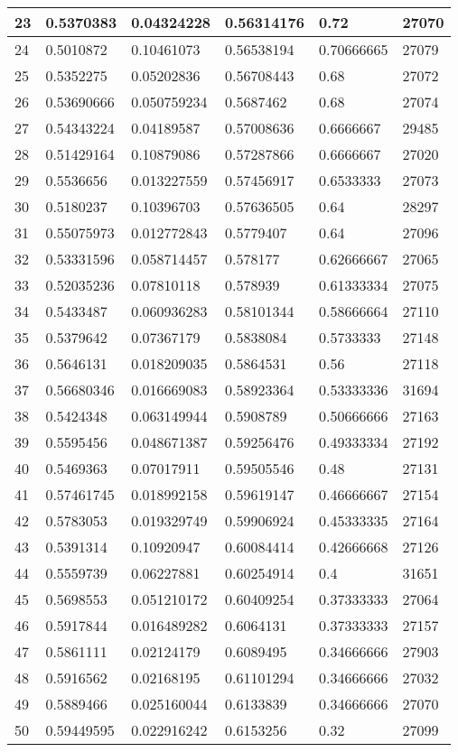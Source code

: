 \begin{longtable}{|l|l|l|l|l|l|}
23 & 0.5370383 & 0.04324228 & 0.56314176 & 0.72 & 27070 \\ \hline 
24 & 0.5010872 & 0.10461073 & 0.56538194 & 0.70666665 & 27079 \\ \hline 
25 & 0.5352275 & 0.05202836 & 0.56708443 & 0.68 & 27072 \\ \hline 
26 & 0.53690666 & 0.050759234 & 0.5687462 & 0.68 & 27074 \\ \hline 
27 & 0.54343224 & 0.04189587 & 0.57008636 & 0.6666667 & 29485 \\ \hline 
28 & 0.51429164 & 0.10879086 & 0.57287866 & 0.6666667 & 27020 \\ \hline 
29 & 0.5536656 & 0.013227559 & 0.57456917 & 0.6533333 & 27073 \\ \hline 
30 & 0.5180237 & 0.10396703 & 0.57636505 & 0.64 & 28297 \\ \hline 
31 & 0.55075973 & 0.012772843 & 0.5779407 & 0.64 & 27096 \\ \hline 
32 & 0.53331596 & 0.058714457 & 0.578177 & 0.62666667 & 27065 \\ \hline 
33 & 0.52035236 & 0.07810118 & 0.578939 & 0.61333334 & 27075 \\ \hline 
34 & 0.5433487 & 0.060936283 & 0.58101344 & 0.58666664 & 27110 \\ \hline 
35 & 0.5379642 & 0.07367179 & 0.5838084 & 0.5733333 & 27148 \\ \hline 
36 & 0.5646131 & 0.018209035 & 0.5864531 & 0.56 & 27118 \\ \hline 
37 & 0.56680346 & 0.016669083 & 0.58923364 & 0.53333336 & 31694 \\ \hline 
38 & 0.5424348 & 0.063149944 & 0.5908789 & 0.50666666 & 27163 \\ \hline 
39 & 0.5595456 & 0.048671387 & 0.59256476 & 0.49333334 & 27192 \\ \hline 
40 & 0.5469363 & 0.07017911 & 0.59505546 & 0.48 & 27131 \\ \hline 
41 & 0.57461745 & 0.018992158 & 0.59619147 & 0.46666667 & 27154 \\ \hline 
42 & 0.5783053 & 0.019329749 & 0.59906924 & 0.45333335 & 27164 \\ \hline 
43 & 0.5391314 & 0.10920947 & 0.60084414 & 0.42666668 & 27126 \\ \hline 
44 & 0.5559739 & 0.06227881 & 0.60254914 & 0.4 & 31651 \\ \hline 
45 & 0.5698553 & 0.051210172 & 0.60409254 & 0.37333333 & 27064 \\ \hline 
46 & 0.5917844 & 0.016489282 & 0.6064131 & 0.37333333 & 27157 \\ \hline 
47 & 0.5861111 & 0.02124179 & 0.6089495 & 0.34666666 & 27903 \\ \hline 
48 & 0.5916562 & 0.02168195 & 0.61101294 & 0.34666666 & 27032 \\ \hline 
49 & 0.5889466 & 0.025160044 & 0.6133839 & 0.34666666 & 27070 \\ \hline 
50 & 0.59449595 & 0.022916242 & 0.6153256 & 0.32 & 27099 \\ \hline 
\end{longtable}